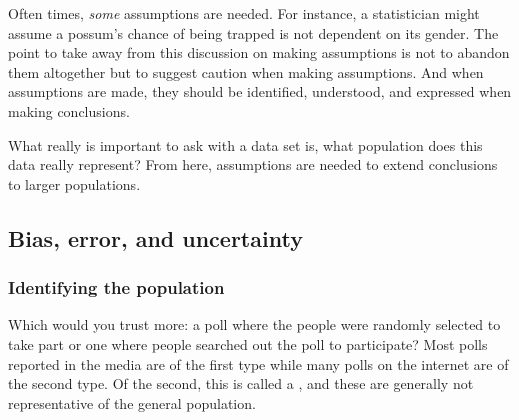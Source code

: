 Often times, \emph{some} assumptions are needed. For instance, a statistician might assume a possum's chance of being trapped is not dependent on its gender. The point to take away from this discussion on making assumptions is not to abandon them altogether but to suggest caution when making assumptions. And when assumptions are made, they should be identified, understood, and expressed when making conclusions.

What really is important to ask with a data set is, what population does this data really represent? From here, assumptions are needed to extend conclusions to larger populations.

\subsection{Bias, error, and uncertainty}

\subsubsection{Identifying the population}

Which would you trust more: a poll where the people were randomly selected to take part or one where people searched out the poll to participate? Most polls reported in the media are of the first type while many polls on the internet are of the second type. Of the second, this is called a , and these are generally not representative of the general population.

